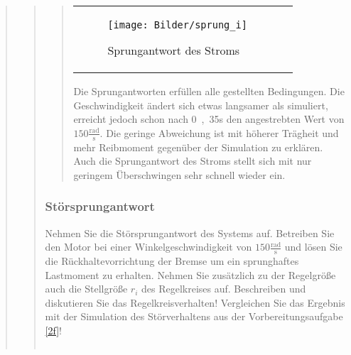 \begin{quote}
\begin{quote}
\begin{quote}
\begin{center}
\begin{tabular}{ll}
            \begin{minipage}{0.6\textwidth}
                \begin{figure}[H]
                    \label{fig:sprung_i}
                    \texttt{[image: Bilder/sprung\_i]}
                    \caption{Sprungantwort des Stroms}
                \end{figure}
                
            \end{minipage}
            
        \end{tabular}
        \end{center}
        
        \vspace{2em}
        
        Die Sprungantworten erfüllen alle gestellten Bedingungen. Die Geschwindigkeit ändert sich etwas langsamer als
        simuliert, erreicht jedoch schon nach \si{0,35}{s} den angestrebten Wert von $150 \mathrm{\frac{rad}{s}}$. Die geringe
        Abweichung ist mit höherer Trägheit und mehr Reibmoment gegenüber der Simulation zu erklären.\\
        Auch die Sprungantwort des Stroms stellt sich mit nur geringem Überschwingen sehr schnell wieder ein.
        
        
        
        \end{quote}
        
        
        \subsubsection{Störsprungantwort}
        Nehmen Sie die Störsprungantwort des Systems auf. Betreiben Sie den Motor bei einer Winkelgeschwindigkeit von $150
        \mathrm{\frac{rad}{s}}$ und lösen Sie die Rückhaltevorrichtung der Bremse um ein sprunghaftes Lastmoment zu erhalten.
        Nehmen Sie zusätzlich zu der Regelgröße auch die Stellgröße $r_i$ des Regelkreises auf. Beschreiben und diskutieren Sie
        das Regelkreisverhalten! Vergleichen Sie das Ergebnis mit der Simulation des Störverhaltens aus der Vorbereitungsaufgabe
        \ref{2f}!
        
        \begin{quote}
            
        \begin{center}
        \begin{tabular}{ll}
        

\end{tabular}
\end{center}
\end{quote}
\end{quote}
\end{quote}
